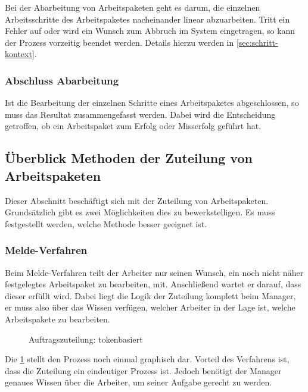 Bei der Abarbeitung von Arbeitspaketen geht es darum,
die einzelnen Arbeitsschritte des Arbeitspaketes nacheinander linear abzuarbeiten.
Tritt ein Fehler auf oder wird ein Wunsch zum Abbruch im System eingetragen,
so kann der Prozess vorzeitig beendet werden. Details hierzu werden in \cref{sec:schritt-kontext}.

\subsubsection{Abschluss Abarbeitung}

Ist die Bearbeitung der einzelnen Schritte eines Arbeitspaketes abgeschlossen,
so muss das Resultat zusammengefasst werden. 
Dabei wird die Entscheidung getroffen,
ob ein Arbeitspaket zum Erfolg oder Misserfolg geführt hat.

\subsection{Überblick Methoden der Zuteilung von Arbeitspaketen}
\label{sec:methoden:zuteilung}

Dieser Abschnitt beschäftigt sich mit der Zuteilung von Arbeitspaketen.
Grundsätzlich gibt es zwei Möglichkeiten dies zu bewerkstelligen.
Es muss festgestellt werden, welche Methode besser geeignet ist.

\subsubsection{Melde-Verfahren}
Beim Melde-Verfahren teilt der Arbeiter nur seinen Wunsch, ein noch nicht näher festgelegtes Arbeitspaket zu bearbeiten, mit.
Anschließend wartet er darauf, dass dieser erfüllt wird.
Dabei liegt die Logik der Zuteilung komplett beim Manager,
er muss also über das Wissen verfügen,
welcher Arbeiter in der Lage ist, welche Arbeitspakete zu bearbeiten.

\begin{figure}[ht] 
    \centering
  \begin{sequencediagram}
  \end{sequencediagram}
  \caption{Auftragszuteilung: tokenbasiert}
  \label{fig:auftrag-zuteilung-token}
\end{figure}

Die \cref{fig:auftrag-zuteilung-token} stellt den Prozess noch einmal graphisch dar.
Vorteil des Verfahrens ist, dass die Zuteilung ein eindeutiger Prozess ist.
Jedoch benötigt der Manager genaues Wissen über die Arbeiter,
um seiner Aufgabe gerecht zu werden.

